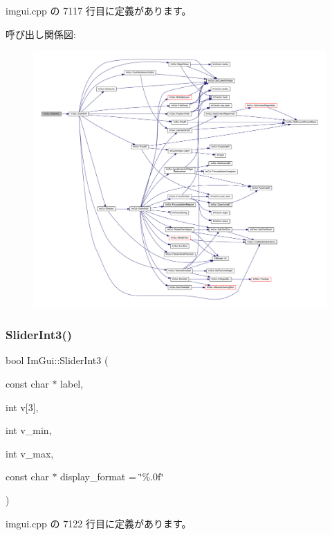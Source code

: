  imgui.\+cpp の 7117 行目に定義があります。

呼び出し関係図\+:\nopagebreak
\begin{figure}[H]
\begin{center}
\leavevmode
\includegraphics[width=350pt]{namespace_im_gui_a9dbd0490704d3bb4be10fdebe21d402d_cgraph}
\end{center}
\end{figure}
\mbox{\label{namespace_im_gui_a099188a7fdaad1a8103e6e24f41e1a8a}} 
\subsubsection{\texorpdfstring{Slider\+Int3()}{SliderInt3()}}
{\footnotesize\ttfamily bool Im\+Gui\+::\+Slider\+Int3 (\begin{DoxyParamCaption}\item[{const char $\ast$}]{label,  }\item[{int}]{v\mbox{[}3\mbox{]},  }\item[{int}]{v\+\_\+min,  }\item[{int}]{v\+\_\+max,  }\item[{const char $\ast$}]{display\+\_\+format = {\ttfamily \char`\"{}\%.0f\char`\"{}} }\end{DoxyParamCaption})}



 imgui.\+cpp の 7122 行目に定義があります。

